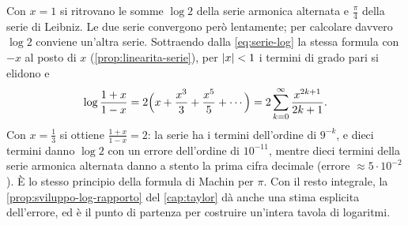 Con $x=1$ si ritrovano le somme $\log2$ della serie armonica alternata e $\frac\pi4$ della
serie di Leibniz. Le due serie convergono però lentamente; per calcolare davvero $\log2$
conviene un'altra serie. Sottraendo dalla \eqref{eq:serie-log} la stessa formula con $-x$
al posto di $x$ (\cref{prop:linearita-serie}), per $\lvert x\rvert<1$ i termini di grado pari si
elidono e
\begin{equation}\label{eq:serie-log-rapporto}
  \log\frac{1+x}{1-x}=2\Bigl(x+\frac{x^{3}}3+\frac{x^{5}}5+\cdots\Bigr)=2\sum_{k=0}^{\infty}\frac{x^{2k+1}}{2k+1} .
\end{equation}
Con $x=\frac13$ si ottiene $\frac{1+x}{1-x}=2$: la serie ha i termini dell'ordine di $9^{-k}$, e dieci
termini danno $\log2$ con un errore dell'ordine di $10^{-11}$, mentre dieci termini della
serie armonica alternata danno a stento la prima cifra decimale (errore $\approx5\cdot10^{-2}$). È lo stesso principio della formula di Machin
per $\pi$. Con il resto integrale, la \cref{prop:sviluppo-log-rapporto} del
\cref{cap:taylor} dà anche una stima esplicita dell'errore, ed è il punto di partenza per
costruire un'intera tavola di logaritmi.


